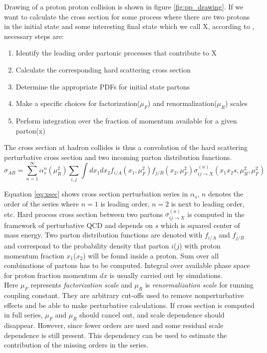 Drawing of a proton proton collision is shown in figure \ref{fig:pp_drawing}. If we want to calculate the cross section for some process where there are two protons in the initial state and some interesting final state which we call X, according to \cite{Campbell:2006wx}, necessary steps are:
\begin{enumerate}
	\item Identify the leading order partonic processes that contribute to X
	\item Calculate the corresponding hard scattering cross section
	\item Determine the appropriate PDFs for initial state partons
	\item Make a specific choices for factorization($\mu_F$) and renormalization($\mu_R$) scales
	\item Perform integration over the fraction of momentum available for a given parton(x)  
\end{enumerate}
The cross section at hadron collides is thus a convolution of the hard scattering perturbative cross section and two incoming parton distribution functions.
\begin{equation}
\sigma_{AB} = \sum\limits_{n=1}^{\infty} \alpha_{s}^{n}(\mu_{R}^2)\sum\limits_{i,j} \int dx_1 dx_2 f_{i/A}(x_1,\mu_{F}^2) f_{j/B}(x_2,\mu_{F}^2) \sigma_{ij \rightarrow X}^{(n)}(x_1 x_2s,\mu_{R}^2,\mu_{F}^2)
 \label{eq:xsec}
\end{equation} 
\par Equation \ref{eq:xsec} shows cross section perturbation series in $\alpha_s$, $n$ denotes the order of the series where $n=1$ is leading order, $n=2$ is next to leading order, etc. 
Hard process cross section between two partons $\sigma_{ij \rightarrow X}^{(n)}$ is computed in the framework of perturbative QCD and depends on $s$ which is squared center of mass energy. Two parton distribution functions are denoted with $f_{i/A}$ and $f_{j/B}$ and correspond to the probability density that parton $i$($j$) with proton momentum fraction $x_1$($x_2$) will be found inside a proton. Sum over all combinations of partons has to be computed. Integral over available phase space for proton fraction momentum $dx$ is usually carried out by simulations.\\ 
Here $\mu_F$ represents \textit{factorization scale} and $\mu_R$ is \textit{renormalization scale} for running coupling constant. They are arbitrary cut-offs used to remove nonperturbative effects and be able to make perturbative calculations. If cross section is computed in full series, $\mu_F$ and $\mu_R$ should cancel out, and scale dependence should disappear. However, since fewer orders are used and some residual scale dependence is still present. This dependency can be used to estimate the contribution of the missing orders in the series.  
